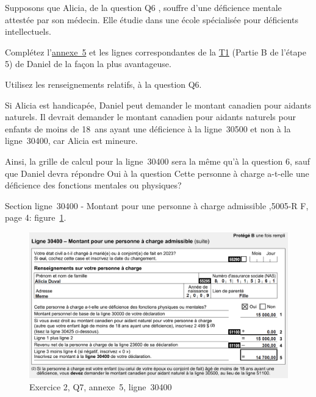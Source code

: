 \begin{question}
	Supposons que Alicia, de la question \og Q6 \fg{}, souffre d'une déficience mentale attestée par son médecin. Elle étudie dans une école spécialisée pour déficients intellectuels.
	
	Complétez l'\href{https://www.canada.ca/fr/agence-revenu/services/formulaires-publications/trousses-impot-toutes-annees-imposition/trousse-generale-impot-prestations/5000-s5.html}{annexe~5} et les lignes correspondantes de la \href{https://www.canada.ca/fr/agence-revenu/services/formulaires-publications/trousses-impot-toutes-annees-imposition/trousse-generale-impot-prestations/quebec/5005-r.html}{T1} (Partie B de l'étape 5) de Daniel de la façon la plus avantageuse. 
	
	Utilisez les renseignements relatifs, à la question Q6.
\end{question}
Si Alicia est handicapée, Daniel peut demander le montant canadien pour aidants naturels. Il devrait demander le montant canadien pour aidants naturels pour enfants de moins de 18~ans ayant une déficience à la ligne~30500 et non à la ligne~30400, car Alicia est mineure.

Ainsi, la grille de calcul pour la ligne~30400 sera la même qu'à la question 6, sauf que Daniel devra répondre \og Oui\fg{} à la question \og Cette personne à charge a-t-elle une déficience des fonctions mentales ou physiques?\fg{}

Section \og ligne~30400 - Montant pour une personne à charge admissible \fg{},5005-R F, page 4: figure~\ref{fig:chap4Exercice2Q7S5}.
\begin{figure}
	\centering
	\includegraphics[width=.9\textwidth]{exercice/4-2/Q7/30400.png}
	\caption[]{Exercice 2, Q7, annexe~5, ligne~30400}
	\label{fig:chap4Exercice2Q7S5}
\end{figure}

